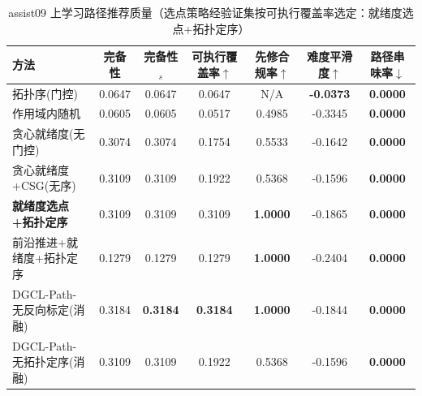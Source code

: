 \begin{table}[htbp]
\centering
\caption{assist09 上学习路径推荐质量（选点策略经验证集按可执行覆盖率选定：就绪度选点+拓扑定序）}
\label{tab:path_assist09}
\begin{tabular}{lcccccc}
\toprule
方法 & 完备性 & 完备性$_s$ & 可执行覆盖率$\uparrow$ & 先修合规率$\uparrow$ & 难度平滑度$\uparrow$ & 路径串味率$\downarrow$ \\
\midrule
拓扑序(门控) & 0.0647 & 0.0647 & 0.0647 & N/A & \textbf{-0.0373} & \textbf{0.0000} \\
作用域内随机 & 0.0605 & 0.0605 & 0.0517 & 0.4985 & -0.3345 & \textbf{0.0000} \\
贪心就绪度(无门控) & 0.3074 & 0.3074 & 0.1754 & 0.5533 & -0.1642 & \textbf{0.0000} \\
贪心就绪度+CSG(无序) & 0.3109 & 0.3109 & 0.1922 & 0.5368 & -0.1596 & \textbf{0.0000} \\
\textbf{就绪度选点+拓扑定序} & 0.3109 & 0.3109 & 0.3109 & \textbf{1.0000} & -0.1865 & \textbf{0.0000} \\
前沿推进+就绪度+拓扑定序 & 0.1279 & 0.1279 & 0.1279 & \textbf{1.0000} & -0.2404 & \textbf{0.0000} \\
DGCL-Path-无反向标定(消融) & 0.3184 & \textbf{0.3184} & \textbf{0.3184} & \textbf{1.0000} & -0.1844 & \textbf{0.0000} \\
DGCL-Path-无拓扑定序(消融) & 0.3109 & 0.3109 & 0.1922 & 0.5368 & -0.1596 & \textbf{0.0000} \\
\bottomrule
\end{tabular}
\end{table}